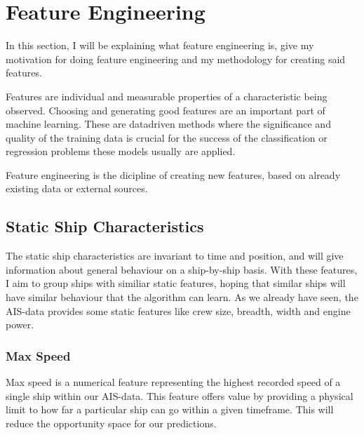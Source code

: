 \chapter[Feature Engineering]{Feature Engineering}
\label{chp:labelkey}
\begin{info}
\end{info}

In this section, I will be explaining what feature engineering is, give my motivation for doing feature engineering and my methodology for creating said features.

Features are individual and measurable properties of a characteristic being observed. Choosing and generating good features are an important part of machine learning. These are datadriven methods where the significance and quality of the training data is crucial for the success of the classification or regression problems these models usually are applied.

Feature engineering is the dicipline of creating new features, based on already existing data or external sources.
\section{Static Ship Characteristics}
\begin{info}{}
\end{info}

The static ship characteristics are invariant to time and position, and will give information about general behaviour on a ship-by-ship basis. With these features, I aim to group ships with similiar static features, hoping that similar ships will have similar behaviour that the algorithm can learn. As we already have seen, the AIS-data provides some static features like crew size, breadth, width and engine power.

\subsection{Max Speed}
Max speed is a numerical feature representing the highest recorded speed of a single ship within our AIS-data. This feature offers value by providing a physical limit to how far a particular ship can go within a given timeframe. This will reduce the opportunity space for our predictions.


